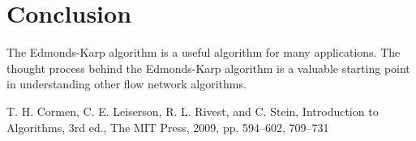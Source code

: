 \documentclass[conference]{IEEEtran}
\begin{document}

\section{Conclusion}
The Edmonds-Karp algorithm is a useful algorithm for many applications. The thought process
behind the Edmonds-Karp algorithm is a valuable starting point in understanding other 
flow network algorithms. 

\begin{thebibliography}{00}
     T. H. Cormen, C. E. Leiserson, R. L. Rivest, and C. Stein, Introduction to Algorithms, 3rd ed., The MIT Press, 2009, pp. 594--602, 709--731 
\end{thebibliography}
\end{document}
